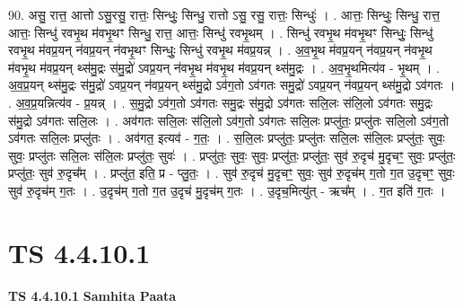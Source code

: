\documentclass[17pt]{extarticle}
\begin{document}
90. असु॒ रात्त॒ आत्तो ऽसु॒रसु॒ रात्तः॒ सिन्धुः॒ सिन्धु॒ रात्तो ऽसु॒ रसु॒ रात्तः॒ सिन्धुः॑ । . आत्तः॒ सिन्धुः॒ सिन्धु॒ रात्त॒ आत्तः॒ सिन्धु॑ रवभृ॒थ म॑वभृ॒थꣳ सिन्धु॒ रात्त॒ आत्तः॒ सिन्धु॑ रवभृ॒थम् । . सिन्धु॑ रवभृ॒थ म॑वभृ॒थꣳ सिन्धुः॒ सिन्धु॑ रवभृ॒थ म॑वप्र॒यन् न॑वप्र॒यन् न॑वभृ॒थꣳ सिन्धुः॒ सिन्धु॑ रवभृ॒थ म॑वप्र॒यन्न् । . अ॒व॒भृ॒थ म॑वप्र॒यन् न॑वप्र॒यन् न॑वभृ॒थ म॑वभृ॒थ म॑वप्र॒यन् थ्स॑मु॒द्रः स॑मु॒द्रो॑ ऽवप्र॒यन् न॑वभृ॒थ म॑वभृ॒थ म॑वप्र॒यन् थ्स॑मु॒द्रः । . अ॒व॒भृ॒थमित्य॑व - भृ॒थम् । . अ॒व॒प्र॒यन् थ्स॑मु॒द्रः स॑मु॒द्रो॑ ऽवप्र॒यन् न॑वप्र॒यन् थ्स॑मु॒द्रो ऽव॑ग॒तो ऽव॑गतः समु॒द्रो॑ ऽवप्र॒यन् न॑वप्र॒यन् थ्स॑मु॒द्रो ऽव॑गतः । . अ॒व॒प्र॒यन्नित्य॑व - प्र॒यन्न् । . स॒मु॒द्रो ऽव॑ग॒तो ऽव॑गतः समु॒द्रः स॑मु॒द्रो ऽव॑गतः सलि॒लः स॑लि॒लो ऽव॑गतः समु॒द्रः स॑मु॒द्रो ऽव॑गतः सलि॒लः । . अव॑गतः सलि॒लः स॑लि॒लो ऽव॑ग॒तो ऽव॑गतः सलि॒लः प्रप्लु॑तः॒ प्रप्लु॑तः सलि॒लो ऽव॑ग॒तो ऽव॑गतः सलि॒लः प्रप्लु॑तः । . अव॑गत॒ इत्यव॑ - ग॒तः॒ । . स॒लि॒लः प्रप्लु॑तः॒ प्रप्लु॑तः सलि॒लः स॑लि॒लः प्रप्लु॑तः॒ सुवः॒ सुवः॒ प्रप्लु॑तः सलि॒लः स॑लि॒लः प्रप्लु॑तः॒ सुवः॑ । . प्रप्लु॑तः॒ सुवः॒ सुवः॒ प्रप्लु॑तः॒ प्रप्लु॑तः॒ सुव॑ रु॒दृच॑ मु॒दृचꣳ॒॒ सुवः॒ प्रप्लु॑तः॒ प्रप्लु॑तः॒ सुव॑ रु॒दृच᳚म् । . प्रप्लु॑त॒ इति॒ प्र - प्लु॒तः॒ । . सुव॑ रु॒दृच॑ मु॒दृचꣳ॒॒ सुवः॒ सुव॑ रु॒दृच॑म् ग॒तो ग॒त उ॒दृचꣳ॒॒ सुवः॒ सुव॑ रु॒दृच॑म् ग॒तः । . उ॒दृच॑म् ग॒तो ग॒त उ॒दृच॑ मु॒दृच॑म् ग॒तः । . उ॒दृच॒मित्यु॑त् - ऋच᳚म् । . ग॒त इति॑ ग॒तः । \newline
\pagebreak
{}

\section{ TS 4.4.10.1 }

\textbf{TS 4.4.10.1 } \newline
\textbf{Samhita Paata} \newline
\end{document}
